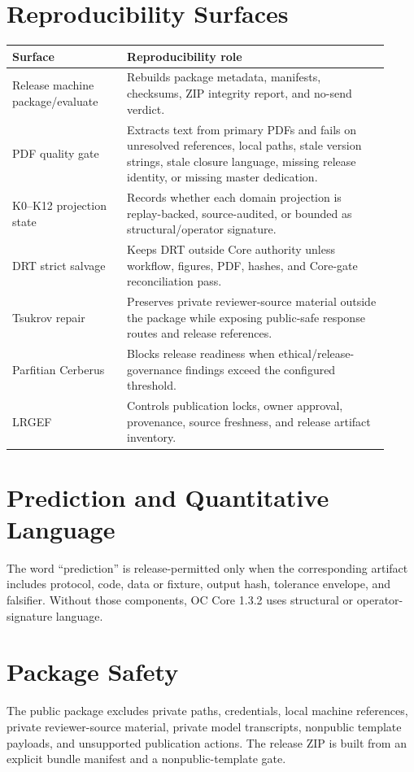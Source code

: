 \documentclass[11pt,a4paper]{article}
\begin{document}
\section*{Reproducibility Surfaces}
\begin{longtable}{>{\raggedright\arraybackslash}p{0.28\linewidth}>{\raggedright\arraybackslash}p{0.64\linewidth}}
\textbf{Surface} & \textbf{Reproducibility role}\\
\hline
Release machine package/evaluate & Rebuilds package metadata, manifests, checksums, ZIP integrity report, and no-send verdict.\\
PDF quality gate & Extracts text from primary PDFs and fails on unresolved references, local paths, stale version strings, stale closure language, missing release identity, or missing master dedication.\\
K0--K12 projection state & Records whether each domain projection is replay-backed, source-audited, or bounded as structural/operator signature.\\
DRT strict salvage & Keeps DRT outside Core authority unless workflow, figures, PDF, hashes, and Core-gate reconciliation pass.\\
Tsukrov repair & Preserves private reviewer-source material outside the package while exposing public-safe response routes and release references.\\
Parfitian Cerberus & Blocks release readiness when ethical/release-governance findings exceed the configured threshold.\\
LRGEF & Controls publication locks, owner approval, provenance, source freshness, and release artifact inventory.\\
\end{longtable}

\section*{Prediction and Quantitative Language}
The word ``prediction'' is release-permitted only when the corresponding artifact includes protocol, code, data or fixture, output hash, tolerance envelope, and falsifier. Without those components, OC Core 1.3.2 uses structural or operator-signature language.

\section*{Package Safety}
The public package excludes private paths, credentials, local machine references, private reviewer-source material, private model transcripts, nonpublic template payloads, and unsupported publication actions. The release ZIP is built from an explicit bundle manifest and a nonpublic-template gate.
\end{document}
